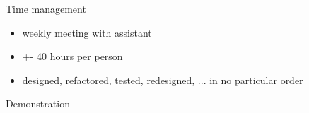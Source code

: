 \documentclass[10pt]{beamer}
\begin{document}
\begin{frame}[fragile]{Time management}
\begin{itemize}
\item weekly meeting with assistant
\item +- 40 hours per person
\item designed, refactored, tested, redesigned, ... in no particular order
\end{itemize}
\end{frame}

{
\begin{frame}[standout]
  Demonstration
\end{frame}
}
\end{document}

